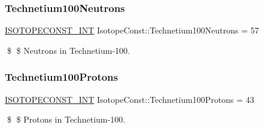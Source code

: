 \subsubsection{\texorpdfstring{Technetium100\+Neutrons}{Technetium100Neutrons}}
{\footnotesize\ttfamily \mbox{\hyperlink{group___isotope_const-_macros_ga5f18360b3e99483a35c32d789e62621c}{I\+S\+O\+T\+O\+P\+E\+C\+O\+N\+S\+T\+\_\+\+I\+NT}} Isotope\+Const\+::\+Technetium100\+Neutrons = 57}

\$ \$ Neutrons in Technetium-\/100. \mbox{\label{group___isotope_const-_technetium-_tc100_ga9ab511ac4985f47b9abae97c0114831f}} 
\subsubsection{\texorpdfstring{Technetium100\+Protons}{Technetium100Protons}}
{\footnotesize\ttfamily \mbox{\hyperlink{group___isotope_const-_macros_ga5f18360b3e99483a35c32d789e62621c}{I\+S\+O\+T\+O\+P\+E\+C\+O\+N\+S\+T\+\_\+\+I\+NT}} Isotope\+Const\+::\+Technetium100\+Protons = 43}

\$ \$ Protons in Technetium-\/100. 